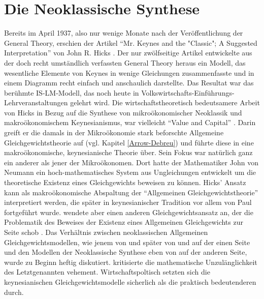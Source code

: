 \section{Die Neoklassische Synthese}

Bereits im April 1937, also nur wenige Monate nach der Veröffentlichung der General Theory, erschien der  Artikel "`Mr. Keynes and the "Classic"; A Suggested Interpretation"' von John R. Hicks \parencite{Hicks1937}. Der nur zwölfseitige Artikel entwickelte aus der doch recht umständlich verfassten General Theory heraus ein Modell, das wesentliche Elemente von Keynes in wenige Gleichungen zusammenfasste und in einem Diagramm recht einfach und anschaulich darstellte. Das Resultat war das berühmte IS-LM-Modell, das noch heute in Volkswirtschafts-Einführungs-Lehrveranstaltungen gelehrt wird. Die wirtschaftstheoretisch  bedeutsamere Arbeit von Hicks in Bezug auf die Synthese von mikroökonomischer Neoklassik und makroökonomischem Keynesianismus, war vielleicht "`Value and Capital"' \parencite{Hicks1939}. Darin greift er die damals in der Mikroökonomie stark beforschte Allgemeine Gleichgewichtstheorie auf (vgl. Kapitel \ref{Arrow-Debreu}) und führte diese in eine makroökonomische, keynesianische Theorie über. Sein Fokus war natürlich ganz ein anderer als jener der Mikroökonomen. Dort hatte der Mathematiker John von Neumann ein hoch-mathematisches System aus Ungleichungen entwickelt um die theoretische Existenz eines Gleichgewichts beweisen zu können. Hicks' Ansatz kann als makroökonomische Abspaltung der "`Allgemeinen Gleichgewichtstheorie"' interpretiert werden, die später in keynesianischer Tradition vor allem von Paul \textcite{Samuelson1947} fortgeführt wurde. \textcite{Hicks1939} wendete aber einen anderen Gleichgewichtsansatz an, der die Problematik des Beweises der Existenz eines Allgemeinen Gleichgewichts zur Seite schob \parencite[S. 21]{Weintraub1983}. Das Verhältnis zwischen neoklassischen Allgemeinen Gleichgewichtsmodellen, wie jenem von \textcite{Neumann1937} und später von \textcite{Arrow1954} und \textcite{McKenzie1954} auf der einen Seite und den Modellen der Neoklassische Synthese eben von \textcite{Hicks1939} auf der anderen Seite, wurde zu Beginn heftig diskutiert. \textcite{Morgenstern1941} kritisierte die mathematische Unzulänglichkeit des Letztgenannten vehement. Wirtschaftspoltisch setzten sich die keynesianischen Gleichgewichtsmodelle sicherlich als die praktisch bedeutenderen durch. 

